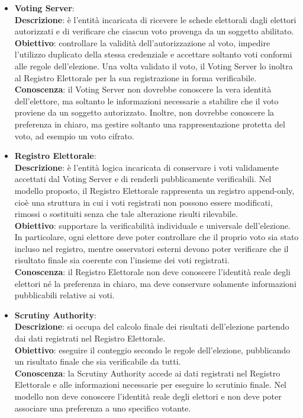 \documentclass[a4paper,12pt]{article}
\begin{document}
\begin{itemize}
        \item \textbf{Voting Server}:\\
            \textbf{Descrizione}: è l'entità incaricata di ricevere le schede elettorali dagli elettori autorizzati e di verificare che ciascun voto provenga da un soggetto abilitato.\\
            \textbf{Obiettivo}: controllare la validità dell'autorizzazione al voto, impedire l'utilizzo duplicato della stessa credenziale e accettare soltanto voti conformi alle regole dell'elezione. 
            Una volta validato il voto, il Voting Server lo inoltra al Registro Elettorale per la sua registrazione in forma verificabile.\\
            \textbf{Conoscenza}: il Voting Server non dovrebbe conoscere la vera identità dell'elettore, ma soltanto le informazioni necessarie a stabilire che il voto proviene da un soggetto autorizzato. 
            Inoltre, non dovrebbe conoscere la preferenza in chiaro, ma gestire soltanto una rappresentazione protetta del voto, ad esempio un voto cifrato.

        \item \textbf{Registro Elettorale}:\\
            \textbf{Descrizione}: è l'entità logica incaricata di conservare i voti validamente accettati dal Voting Server e di renderli pubblicamente verificabili. 
            Nel modello proposto, il Registro Elettorale rappresenta un registro append-only, cioè una struttura in cui i voti registrati non possono essere modificati, rimossi o sostituiti senza che tale alterazione risulti rilevabile.\\
            \textbf{Obiettivo}: supportare la verificabilità individuale e universale dell'elezione. 
            In particolare, ogni elettore deve poter controllare che il proprio voto sia stato incluso nel registro, mentre osservatori esterni devono poter verificare che il risultato finale sia coerente con l'insieme dei voti registrati.\\
            \textbf{Conoscenza}: il Registro Elettorale non deve conoscere l'identità reale degli elettori né la preferenza in chiaro, ma deve conservare solamente informazioni pubblicabili relative ai voti.

        \item \textbf{Scrutiny Authority}:\\
            \textbf{Descrizione}: si occupa del calcolo finale dei risultati dell'elezione partendo dai dati registrati nel Registro Elettorale.\\
            \textbf{Obiettivo}: eseguire il conteggio secondo le regole dell'elezione, pubblicando un risultato finale che sia verificabile da tutti.\\
            \textbf{Conoscenza}: la Scrutiny Authority accede ai dati registrati nel Registro Elettorale e alle informazioni necessarie per eseguire lo scrutinio finale. Nel modello non deve conoscere l'identità reale degli elettori e non deve poter associare una preferenza a uno specifico votante.

    \end{itemize}
\end{document}
